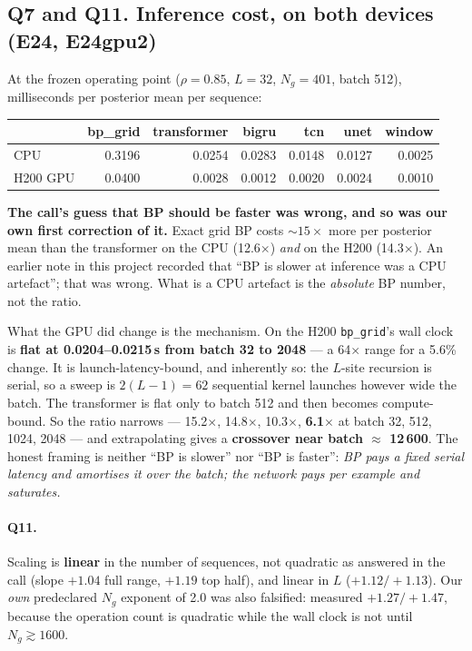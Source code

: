\documentclass[10pt,a4paper]{article}
\newcommand{\corr}{\rho}
\newcommand{\nsites}{L}
\newcommand{\code}[1]{\texttt{\small #1}}
\newcommand{\st}[1]{\textbf{#1}}
\begin{document}
\subsection{Q7 and Q11. Inference cost, on both devices (E24, E24gpu2)}

At the frozen operating point ($\corr=0.85$, $\nsites=32$, $N_g=401$, batch 512), milliseconds
per posterior mean per sequence:

\medskip
\noindent\begin{tabular}{@{}l rrrrrr@{}}
\toprule
& bp\_grid & transformer & bigru & tcn & unet & window \\
\midrule
CPU & 0.3196 & 0.0254 & 0.0283 & 0.0148 & 0.0127 & 0.0025 \\
H200 GPU & 0.0400 & 0.0028 & 0.0012 & 0.0020 & 0.0024 & 0.0010 \\
\bottomrule
\end{tabular}

\medskip
\st{The call's guess that BP should be faster was wrong, and so was our own first correction of
it.} Exact grid BP costs $\sim\!15\times$ more per posterior mean than the transformer on the
CPU (12.6$\times$) \emph{and} on the H200 (14.3$\times$). An earlier note in this project
recorded that ``BP is slower at inference was a CPU artefact''; that was wrong. What is a CPU
artefact is the \emph{absolute} BP number, not the ratio.

What the GPU did change is the mechanism. On the H200 \code{bp\_grid}'s wall clock is
\st{flat at 0.0204--0.0215\,s from batch 32 to 2048} --- a 64$\times$ range for a 5.6\% change.
It is launch-latency-bound, and inherently so: the $\nsites$-site recursion is serial, so a
sweep is $2(\nsites-1)=62$ sequential kernel launches however wide the batch. The transformer is
flat only to batch 512 and then becomes compute-bound. So the ratio narrows --- 15.2$\times$,
14.8$\times$, 10.3$\times$, \st{6.1$\times$} at batch 32, 512, 1024, 2048 --- and extrapolating
gives a \st{crossover near batch $\approx$ 12\,600}. The honest framing is neither ``BP is
slower'' nor ``BP is faster'': \emph{BP pays a fixed serial latency and amortises it over the
batch; the network pays per example and saturates.}

\paragraph{Q11.} Scaling is \st{linear} in the number of sequences, not quadratic as answered in
the call (slope $+1.04$ full range, $+1.19$ top half), and linear in $\nsites$ ($+1.12/+1.13$).
Our \emph{own} predeclared $N_g$ exponent of 2.0 was also falsified: measured $+1.27/+1.47$,
because the operation count is quadratic while the wall clock is not until $N_g\gtrsim1600$.
\end{document}
